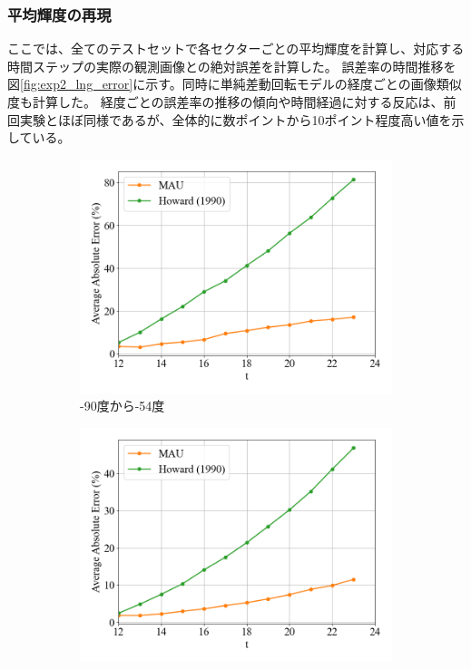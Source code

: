         \subsubsection{平均輝度の再現}
          ここでは、全てのテストセットで各セクターごとの平均輝度を計算し、対応する時間ステップの実際の観測画像との絶対誤差を計算した。
            誤差率の時間推移を図\ref{fig:exp2_lng_error}に示す。同時に単純差動回転モデルの経度ごとの画像類似度も計算した。
            経度ごとの誤差率の推移の傾向や時間経過に対する反応は、前回実験とほぼ同様であるが、全体的に数ポイントから10ポイント程度高い値を示している。
            \begin{figure}[htbp]
              \begin{subfigure}{0.5\textwidth}
                \centering
                \includegraphics[width=\textwidth]{figures/exp2/lng_error_1.png}
                \caption{-90度から-54度}
              \end{subfigure}%
              \begin{subfigure}{0.5\textwidth}
                \centering
                \includegraphics[width=\textwidth]{figures/exp2/lng_error_2.png}

\end{subfigure}
\end{figure}
